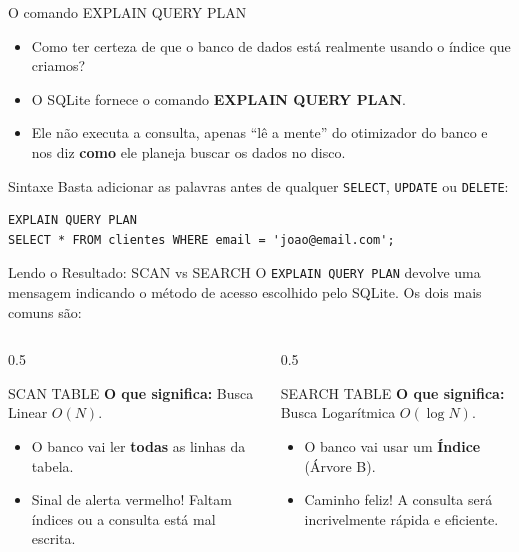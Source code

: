 \documentclass[9pt]{beamer}
\begin{document}
\begin{frame}[fragile]{O comando EXPLAIN QUERY PLAN}
    \begin{itemize}
        \item Como ter certeza de que o banco de dados está realmente usando o índice que criamos?
        \item O SQLite fornece o comando \textbf{EXPLAIN QUERY PLAN}.
        \item Ele não executa a consulta, apenas \textquotedblleft lê a mente\textquotedblright{} do otimizador do banco e nos diz \textbf{como} ele planeja buscar os dados no disco.
    \end{itemize}
    
    \vspace{0.3cm}
    \begin{block}{Sintaxe}
        Basta adicionar as palavras antes de qualquer \texttt{SELECT}, \texttt{UPDATE} ou \texttt{DELETE}:
        \begin{lstlisting}[basicstyle=\ttfamily\scriptsize]
EXPLAIN QUERY PLAN
SELECT * FROM clientes WHERE email = 'joao@email.com';
        \end{lstlisting}
    \end{block}
\end{frame}

\begin{frame}{Lendo o Resultado: SCAN vs SEARCH}
    O \texttt{EXPLAIN QUERY PLAN} devolve uma mensagem indicando o método de acesso escolhido pelo SQLite. Os dois mais comuns são:
    
    \vspace{0.3cm}
    \begin{columns}
        \begin{column}{0.5\textwidth}
            \begin{alertblock}{SCAN TABLE}
                \textbf{O que significa:} Busca Linear $O(N)$.
                \begin{itemize}
                    \item O banco vai ler \textbf{todas} as linhas da tabela.
                    \item Sinal de alerta vermelho! Faltam índices ou a consulta está mal escrita.
                \end{itemize}
            \end{alertblock}
        \end{column}
        \begin{column}{0.5\textwidth}
            \begin{exampleblock}{SEARCH TABLE}
                \textbf{O que significa:} Busca Logarítmica $O(\log N)$.
                \begin{itemize}
                    \item O banco vai usar um \textbf{Índice} (Árvore B).
                    \item Caminho feliz! A consulta será incrivelmente rápida e eficiente.
                \end{itemize}
            \end{exampleblock}
        \end{column}
    \end{columns}
\end{frame}
\end{document}
